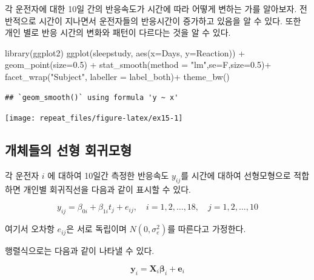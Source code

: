 \documentclass[
]{book}
\newenvironment{Shaded}{\begin{snugshade}}{\end{snugshade}}
\newcommand{\AttributeTok}[1]{\textcolor[rgb]{0.77,0.63,0.00}{#1}}
\newcommand{\FloatTok}[1]{\textcolor[rgb]{0.00,0.00,0.81}{#1}}
\newcommand{\FunctionTok}[1]{\textcolor[rgb]{0.00,0.00,0.00}{#1}}
\newcommand{\NormalTok}[1]{#1}
\newcommand{\SpecialCharTok}[1]{\textcolor[rgb]{0.00,0.00,0.00}{#1}}
\newcommand{\StringTok}[1]{\textcolor[rgb]{0.31,0.60,0.02}{#1}}
\theoremstyle{definition}
\theoremstyle{definition}
\theoremstyle{definition}
\theoremstyle{remark}
\begin{document}
각 운전자에 대한 10일 간의 반응속도가 시간에 따라 어떻게 변하는 가를 알아보자. 전반적으로 시간이 지나면서 운전자들의 반응시간이 증가하고 있음을 알 수 있다. 또한 개인 별로 반응 시간의 변화와 패턴이 다르다는 것을 알 수 있다.

\begin{Shaded}
\begin{Highlighting}[]
\FunctionTok{library}\NormalTok{(ggplot2)}
\FunctionTok{ggplot}\NormalTok{(sleepstudy, }\FunctionTok{aes}\NormalTok{(}\AttributeTok{x=}\NormalTok{Days, }\AttributeTok{y=}\NormalTok{Reaction)) }\SpecialCharTok{+}
     \FunctionTok{geom\_point}\NormalTok{(}\AttributeTok{size=}\FloatTok{0.5}\NormalTok{) }\SpecialCharTok{+}
     \FunctionTok{stat\_smooth}\NormalTok{(}\AttributeTok{method =} \StringTok{"lm"}\NormalTok{,}\AttributeTok{se=}\NormalTok{F,}\AttributeTok{size=}\FloatTok{0.5}\NormalTok{)}\SpecialCharTok{+}
     \FunctionTok{facet\_wrap}\NormalTok{(}\StringTok{"Subject"}\NormalTok{, }\AttributeTok{labeller =}\NormalTok{ label\_both)}\SpecialCharTok{+} 
     \FunctionTok{theme\_bw}\NormalTok{()}
\end{Highlighting}
\end{Shaded}

\begin{verbatim}
## `geom_smooth()` using formula 'y ~ x'
\end{verbatim}

\texttt{[image: repeat\_files/figure-latex/ex15-1]}

\hypertarget{uxac1cuxccb4uxb4e4uxc758-uxc120uxd615-uxd68cuxadc0uxbaa8uxd615}{%
\subsection{개체들의 선형 회귀모형}\label{uxac1cuxccb4uxb4e4uxc758-uxc120uxd615-uxd68cuxadc0uxbaa8uxd615}}

각 운전자 \(i\) 에 대하여 10일간 측정한 반응속도 \(y_{ij}\)를 시간에 대하여 선형모형으로 적합하면 개인별 회귀직선을 다음과 같이 표시할 수 있다.

\begin{equation}
y_{ij} = \beta_{0i} + \beta_{1i} t_j + e_{ij},\quad i=1,2,\dots,18,\quad j=1,2,\dots,10
\label{eq:lmlist1}
\end{equation}

여기서 오차항 \(e_{ij}\)은 서로 독립이며 \(N(0, \sigma^2_e)\)를 따른다고 가정한다.

행렬식으로는 다음과 같이 나타낼 수 있다.

\[ 
\bm y_i =\bm X_i \bm \beta_{i} +\bm e_i 
\]
\end{document}
